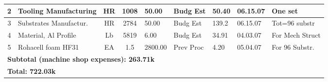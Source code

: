 \begin{table}
\begin{tabular}{|c|p{3.7cm}|c|c|p{1.4cm}|p{1.6cm}|p{1.5cm}|p{1.2cm}|p{2.5cm}|}
{\footnotesize 2} & {\footnotesize Tooling Manufacturing} & {\footnotesize HR} & {\footnotesize 1008} & {\footnotesize 50.00} & {\footnotesize Budg Est} & {\footnotesize 50.40} & {\footnotesize 06.15.07} & {\footnotesize One set }\\ \hline

{\footnotesize 3} & {\footnotesize Substrates Manufactur.} & {\footnotesize HR} & {\footnotesize 2784} & {\footnotesize 50.00} & {\footnotesize Budg Est} & {\footnotesize 139.2} & {\footnotesize 06.15.07} & {\footnotesize Tot=96 substr}\\ \hline

{\footnotesize 4} & {\footnotesize Material, Al Profile} & {\footnotesize Lb} & {\footnotesize 5819} & {\footnotesize 6.00} & {\footnotesize Budg Est} & {\footnotesize 34.91} & {\footnotesize 04.03.07} & {\footnotesize For Mech Struct}\\ \hline

{\footnotesize 5} & {\footnotesize Rohacell foam HF31} & {\footnotesize EA} & {\footnotesize 1.5} & {\footnotesize 2800.00} & {\footnotesize Prev Proc} & {\footnotesize 4.20} & {\footnotesize 05.04.07} & {\footnotesize For 96 Substr.}\\ \hline

\multicolumn{9}{|l|}{ \bf \hspace{0.5cm} Subtotal (machine shop expenses): \hspace{2.6cm} 263.71k }  \\ \hline
\multicolumn{9}{|l|}{ \bf \hspace{0.5cm} Total: \hspace{8.6cm} 722.03k }  \\ \hline

\end{tabular}
\end{table}



\normalsize
